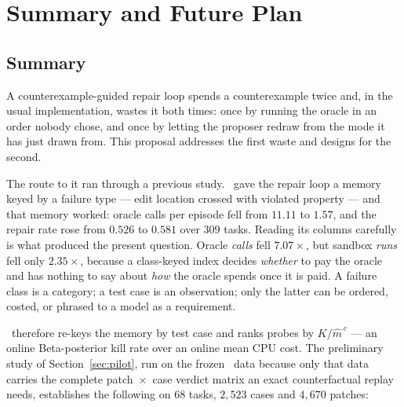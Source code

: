\chapter{Summary and Future Plan}
\label{ch:summary}

\section{Summary}

A counterexample-guided repair loop spends a counterexample twice and, in the
usual implementation, wastes it both times: once by running the oracle in an
order nobody chose, and once by letting the proposer redraw from the mode it
has just drawn from. This proposal addresses the first waste and designs for
the second.

The route to it ran through a previous study. \cegmem\ gave the repair loop a
memory keyed by a failure type --- edit location crossed with violated property
--- and that memory worked: oracle calls per episode fell from $11.11$ to
$1.57$, and the repair rate rose from $0.526$ to $0.581$ over $309$ tasks.
Reading its columns carefully is what produced the present question. Oracle
\emph{calls} fell $7.07\times$, but sandbox \emph{runs} fell only $2.35\times$,
because a class-keyed index decides \emph{whether} to pay the oracle and has
nothing to say about \emph{how} the oracle spends once it is paid. A failure
class is a category; a test case is an observation; only the latter can be
ordered, costed, or phrased to a model as a requirement.

\caster\ therefore re-keys the memory by test case and ranks probes by
$K/\hat m^{\,c}$ --- an online Beta-posterior kill rate over an online mean CPU
cost. The preliminary study of Section~\ref{sec:pilot}, run on the frozen
\cegmem\ data because only that data carries the complete patch~$\times$~case
verdict matrix an exact counterfactual replay needs, establishes the following
on $68$ tasks, $2{,}523$ cases and $4{,}670$ patches:

